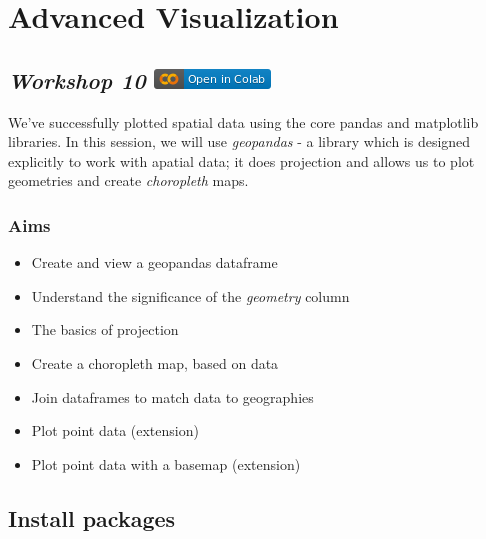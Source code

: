 \documentclass[
  letterpaper,
  DIV=11,
  numbers=noendperiod]{scrreprt}
\providecommand{\tightlist}{%
  \setlength{\itemsep}{0pt}\setlength{\parskip}{0pt}}\usepackage{longtable,booktabs,array}
\begin{document}

\hypertarget{advanced-visualization}{%
\chapter{Advanced Visualization}\label{advanced-visualization}}

\hypertarget{workshop-10-open-in-colab}{%
\section[\emph{Workshop 10} ]{\texorpdfstring{\emph{Workshop 10}
\href{https://colab.research.google.com/github/oballinger/QM2/blob/main/notebooks/W10.\%20Advanced\%20Visualization.ipynb}{\protect\includegraphics{notebooks/../colab-badge.png}}}{Workshop 10 Open In Colab}}\label{workshop-10-open-in-colab}}

We've successfully plotted spatial data using the core pandas and
matplotlib libraries. In this session, we will use \emph{geopandas} - a
library which is designed explicitly to work with apatial data; it does
projection and allows us to plot geometries and create \emph{choropleth}
maps.

\hypertarget{aims-4}{%
\subsection{Aims}\label{aims-4}}

\begin{itemize}
\tightlist
\item
  Create and view a geopandas dataframe
\item
  Understand the significance of the \emph{geometry} column
\item
  The basics of projection
\item
  Create a choropleth map, based on data
\item
  Join dataframes to match data to geographies
\item
  Plot point data (extension)
\item
  Plot point data with a basemap (extension)
\end{itemize}

\hypertarget{install-packages}{%
\section{Install packages}\label{install-packages}}
\end{document}
